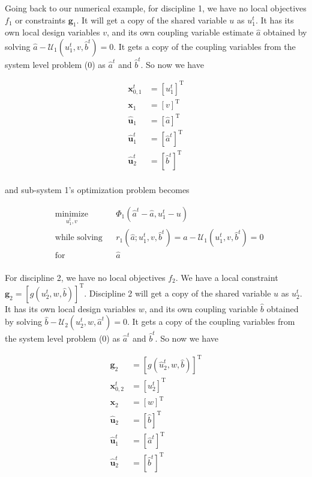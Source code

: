 \documentclass[11pt]{article}
\begin{document}
Going back to our numerical example, for discipline 1, we have no local
objectives \(f_1\) or constraints \(\mathbf{g}_1\). It will get a copy
of the shared variable \(u\) as \(u_1^t\). It has its own local design
variables \(v\), and its own coupling variable estimate \(\hat{a}\)
obtained by solving \(\hat{a} - \mathcal{U}_1(u_1^t,v,\hat{b}^t)=0\). It
gets a copy of the coupling variables from the system level problem (0)
as \(\hat{a}^t\) and \(\hat{b}^t\). So now we have

\begin{align*}
\mathbf{x}_{0,1}^t & = \left[u_1^t\right]^\mathrm{T}\\
\mathbf{x}_1 & = \left[v\right]^\mathrm{T}\\
\hat{\mathbf{u}}_1 & = \left[\hat{a}\right]^\mathrm{T}\\
\hat{\mathbf{u}}_1^t & = \left[\hat{a}^t\right]^\mathrm{T}\\
\hat{\mathbf{u}}_2^t & = \left[\hat{b}^t\right]^\mathrm{T}\\
\end{align*}

and sub-system 1's optimization problem becomes

\begin{equation*}
    \begin{aligned}
        & \underset{u_1^t,v}{\text{minimize}}
        & & \Phi_1(\hat{a}^t - \hat{a},u_1^t - u)\\
        & \text{while solving}
        & & r_1(\hat{a};u_1^t,v,\hat{b}^t) = \hat{a} - \mathcal{U}_1(u_1^t,v,\hat{b}^t) = 0\\
        & \text{for}
        & & \hat{a}\\
    \end{aligned}
    \tag{10}
\end{equation*}

For discipline 2, we have no local objectives \(f_2\). We have a local
constraint
\(\mathbf{g}_2 = \left[g({u}_2^t,w,\hat{b})\right]^\mathrm{T}\).
Discipline 2 will get a copy of the shared variable \(u\) as \(u_2^t\).
It has its own local design variables \(w\), and its own coupling
variable \(\hat{b}\) obtained by solving
\(\hat{b} - \mathcal{U}_2(u_2^t,w,\hat{a}^t)=0\). It gets a copy of the
coupling variables from the system level problem (0) as \(\hat{a}^t\)
and \(\hat{b}^t\). So now we have

\begin{align*}
\mathbf{g}_2 & = \left[g(\hat{u}_2^t,w,\hat{b})\right]^\mathrm{T}\\
\mathbf{x}_{0,2}^t & = \left[u_2^t\right]^\mathrm{T}\\
\mathbf{x}_2 & = \left[w\right]^\mathrm{T}\\
\hat{\mathbf{u}}_2 & = \left[\hat{b}\right]^\mathrm{T}\\
\hat{\mathbf{u}}_1^t & = \left[\hat{a}^t\right]^\mathrm{T}\\
\hat{\mathbf{u}}_2^t & = \left[\hat{b}^t\right]^\mathrm{T}\\
\end{align*}
\end{document}
